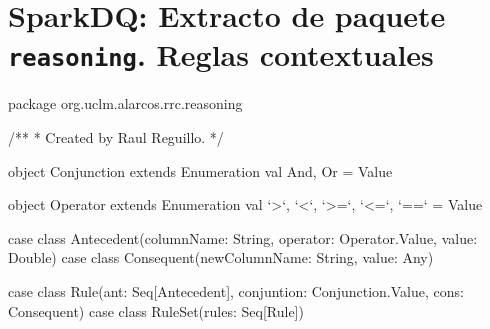 \chapter{SparkDQ: Extracto de paquete \texttt{reasoning}. Reglas contextuales}
\label{reasoning-rule}
\begin{listing}[
  language = scala,
  numbers=left,
  numberstyle=\tiny,
  stepnumber=5,
  numbersep=5pt,
  frame=single,
  caption  = {SparkDQ: Formalización de reglas en SparkDQ},
  label    = code:sparkdq.reasoning]
package org.uclm.alarcos.rrc.reasoning

/**
  * Created by Raul Reguillo. 
  */

object Conjunction extends Enumeration {
  val And, Or = Value
}

object Operator extends Enumeration {
  val `>`, `<`, `>=`, `<=`, `==` = Value
}

case class Antecedent(columnName: String, operator: Operator.Value, value: Double)
case class Consequent(newColumnName: String, value: Any)

case class Rule(ant: Seq[Antecedent], conjuntion: Conjunction.Value, cons: Consequent)
case class RuleSet(rules: Seq[Rule])
\end{listing}
